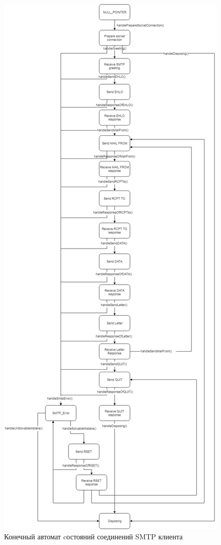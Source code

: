 \documentclass[a4paper,12pt]{report}
\begin{document}
\begin{figure}
    \centering
    \includegraphics[height=\textheight]{static/ClientDiagram_Final.jpg}
    \caption{Конечный автомат cостояний соединений SMTP клиента}
    \label{fig:smtp-client-states}
\end{figure}
\end{document}
